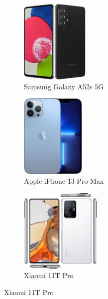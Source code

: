 \documentclass[answers, 10pt, UKenglish]{exam}
\begin{document}
\begin{figure}[htpb]
	\captionsetup[subfigure]{justification=centering}
	\centering
	\begin{subfigure}[htpb]{0.25\linewidth}
	\begin{center}
		\includegraphics[width=\linewidth,height=4cm,keepaspectratio]{samsung-galaxy-a52s-5g}
	\end{center}
	\caption{Samsung Galaxy A52s 5G}
	\label{fig:samsung-galaxy-a52s-5g}
	\end{subfigure}
	\begin{subfigure}[htpb]{0.25\linewidth}
	\begin{center}
		\includegraphics[width=\linewidth,height=4cm,keepaspectratio]{apple-iphone-13-pro-max}
	\end{center}
	\caption{Apple iPhone 13 Pro Max}
	\label{fig:apple-iphone-13-pro-max}
	\end{subfigure}
	\begin{subfigure}[htpb]{0.25\linewidth}
	\begin{center}
		\includegraphics[width=\linewidth,height=4cm,keepaspectratio]{xiaomi-11t-pro}
	\end{center}
	\caption{Xiaomi 11T Pro}
	\label{fig:xiaomi-11t-pro}
	\end{subfigure}


\end{figure}
\end{document}
